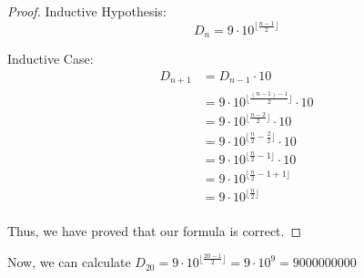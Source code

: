 \documentclass[12pt,letterpaper]{article}
\begin{document}
\begin{enumerate}
\begin{proof}
        Inductive Hypothesis:
        \[D_n = 9 \cdot 10^{\lfloor \frac{n-1}{2} \rfloor}\]

        Inductive Case:
        \begin{align*}
          D_{n+1} &= D_{n-1} \cdot 10 \\
          &= 9 \cdot 10^{\lfloor \frac{(n-1)-1}{2} \rfloor} \cdot 10 \\
          &= 9 \cdot 10^{\lfloor \frac{n-2}{2} \rfloor} \cdot 10 \\
          &= 9 \cdot 10^{\lfloor \frac{n}{2}-\frac{2}{2} \rfloor} \cdot 10 \\
          &= 9 \cdot 10^{\lfloor \frac{n}{2}-1 \rfloor} \cdot 10 \\
          &= 9 \cdot 10^{\lfloor \frac{n}{2}-1+1 \rfloor} \\
          &= 9 \cdot 10^{\lfloor \frac{n}{2} \rfloor} \\
        \end{align*}

        Thus, we have proved that our formula is correct.

      \end{proof}

      Now, we can calculate
      $D_{20} = 9 \cdot 10^{\lfloor \frac{20-1}{2} \rfloor} = 9 \cdot 10^9 = 9000000000$

  \end{enumerate}
\end{document}
